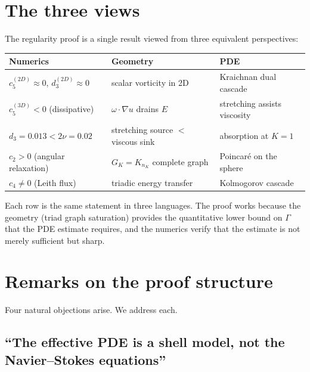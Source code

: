 \documentclass[11pt,a4paper]{article}
\theoremstyle{remark}
\begin{document}
\section{The three views}\label{sec:three-views}

The regularity proof is a single result viewed from three equivalent perspectives:

\begin{center}
\begin{tabular}{lll}
\toprule
\textbf{Numerics} & \textbf{Geometry} & \textbf{PDE} \\
\midrule
$c_5^{(2D)} \approx 0$, $d_3^{(2D)} \approx 0$ & scalar vorticity in 2D & Kraichnan dual cascade \\
$c_5^{(3D)} < 0$ (dissipative) & $\omega \cdot \nabla u$ drains $E$ & stretching assists viscosity \\
$d_3 = 0.013 < 2\nu = 0.02$ & stretching source $<$ viscous sink & absorption at $K = 1$ \\
$c_2 > 0$ (angular relaxation) & $G_K = K_{n_K}$ complete graph & Poincar\'e on the sphere \\
$c_4 \neq 0$ (Leith flux) & triadic energy transfer & Kolmogorov cascade \\
\bottomrule
\end{tabular}
\end{center}

Each row is the same statement in three languages.  The proof works because the geometry (triad graph saturation) provides the quantitative lower bound on $\Gamma$ that the PDE estimate requires, and the numerics verify that the estimate is not merely sufficient but sharp.

\section{Remarks on the proof structure}\label{sec:remarks-proof}

Four natural objections arise.  We address each.

\subsection{``The effective PDE is a shell model, not the Navier--Stokes equations''}
\end{document}
